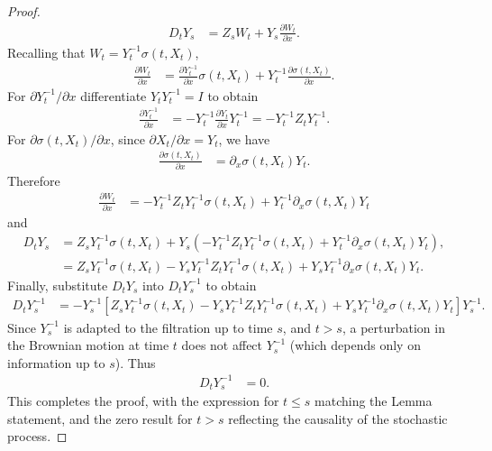 \documentclass[]{interact}
\newcommand{\1}{\mathbf{1}}
\theoremstyle{plain}%
\theoremstyle{definition}
\theoremstyle{remark}
\numberwithin{equation}{section}
\begin{document}
\begin{proof}
\begin{align*}
D_t Y_s &= Z_s W_t + Y_s \frac{\partial W_t}{\partial x}.
\end{align*}
Recalling that $W_t = Y_t^{-1} \sigma(t, X_t)$, 
\begin{align*}
\frac{\partial W_t}{\partial x} &= \frac{\partial Y_t^{-1}}{\partial x} \sigma(t, X_t) + Y_t^{-1} \frac{\partial \sigma(t, X_t)}{\partial x}.
\end{align*}
For \( \partial Y_t^{-1}/\partial x \) differentiate \( Y_t Y_t^{-1} = I \) to obtain
\begin{align*}
\frac{\partial Y_t^{-1}}{\partial x} &= - Y_t^{-1} \frac{\partial Y_t}{\partial x} Y_t^{-1} = - Y_t^{-1} Z_t Y_t^{-1}.
\end{align*}
For \( \partial \sigma(t, X_t)/\partial x\), since \( \partial X_t/\partial x = Y_t \), we have
\begin{align*}
\frac{\partial \sigma(t, X_t)}{\partial x} &= \partial_x \sigma(t, X_t) Y_t.
\end{align*}
Therefore
\begin{align*}
\frac{\partial W_t}{\partial x} &= - Y_t^{-1} Z_t Y_t^{-1} \sigma(t, X_t) + Y_t^{-1} \partial_x \sigma(t, X_t) Y_t
\end{align*}
and
\begin{align*}
D_t Y_s &= Z_s Y_t^{-1} \sigma(t, X_t) + Y_s \left( - Y_t^{-1} Z_t Y_t^{-1} \sigma(t, X_t) + Y_t^{-1} \partial_x \sigma(t, X_t) Y_t \right), \\
&= Z_s Y_t^{-1} \sigma(t, X_t) - Y_s Y_t^{-1} Z_t Y_t^{-1} \sigma(t, X_t) + Y_s Y_t^{-1} \partial_x \sigma(t, X_t) Y_t.
\end{align*}
Finally,  substitute \( D_t Y_s \) into \( D_t Y_s^{-1} \) to obtain
\begin{align*}
D_t Y_s^{-1} &= - Y_s^{-1} \left[ Z_s Y_t^{-1} \sigma(t, X_t) - Y_s Y_t^{-1} Z_t Y_t^{-1} \sigma(t, X_t) + Y_s Y_t^{-1} \partial_x \sigma(t, X_t) Y_t \right] Y_s^{-1}.
\end{align*}
%
Since \( Y_s^{-1} \) is adapted to the filtration up to time \( s \), and \( t > s \), a perturbation in the Brownian motion at time \( t \) does not affect \( Y_s^{-1} \) (which depends only on information up to \( s \)). Thus
\begin{align*}
D_t Y_s^{-1} &= 0.
\end{align*}
This completes the proof, with the expression for \( t \leq s \) matching the Lemma statement, and the zero result for \( t > s \) reflecting the causality of the stochastic process.

\end{proof}
\end{document}

